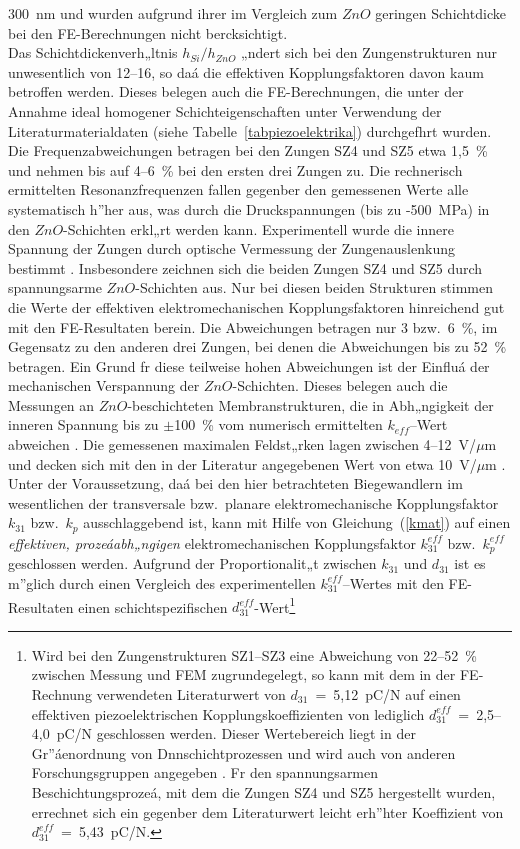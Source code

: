 300~nm und wurden aufgrund ihrer im Vergleich zum $ZnO$ geringen Schichtdicke
bei den FE-Berechnungen nicht bercksichtigt.\\
%
Das Schichtdickenverh„ltnis $h_{Si}/h_{ZnO}$ „ndert sich bei den
Zungenstrukturen nur unwesentlich von  12--16, so daá die effektiven
Kopplungsfaktoren davon kaum betroffen werden. Dieses belegen auch die
FE-Berechnungen, die unter der Annahme ideal homogener Schichteigenschaften
unter Verwendung der Literaturmaterialdaten (siehe
Tabelle~\ref{tabpiezoelektrika}) durchgefhrt wurden.
Die Frequenzabweichungen betragen bei den Zungen SZ4 und SZ5 etwa 1,5~\%
und nehmen bis auf 4--6~\% bei den ersten drei Zungen zu.
Die rechnerisch ermittelten Resonanzfrequenzen fallen gegenber den
gemessenen Werte alle systematisch h”her aus, was durch die Druckspannungen
(bis zu -500~MPa) in den $ZnO$-Schichten erkl„rt werden kann. Experimentell
wurde die innere Spannung der Zungen durch optische Vermessung der
Zungenauslenkung bestimmt \cite{Flik}. Insbesondere zeichnen sich die
beiden Zungen SZ4 und SZ5 durch spannungsarme $ZnO$-Schichten aus.
Nur bei diesen beiden Strukturen stimmen die Werte der effektiven
elektromechanischen Kopplungsfaktoren hinreichend gut mit den FE-Resultaten
berein. Die Abweichungen betragen nur 3 bzw.\ 6~\%, im Gegensatz zu den
anderen drei Zungen, bei denen die Abweichungen bis zu 52~\% betragen.
Ein Grund fr diese teilweise hohen Abweichungen ist der Einfluá der
mechanischen Verspannung der $ZnO$-Schichten.
Dieses belegen auch die Messungen an $ZnO$-beschichteten Membranstrukturen,
die in Abh„ngigkeit der inneren Spannung bis zu $\pm$100~\% vom numerisch
ermittelten $k_{eff}$--Wert abweichen \cite{ABV93}.
Die gemessenen maximalen Feldst„rken lagen zwischen 4--12~V/$\mu$m und
decken sich mit den in der Literatur angegebenen Wert von etwa 10~V/$\mu$m
\cite{Smi92b}.\\
%
Unter der Voraussetzung, daá bei den hier betrachteten Biegewandlern
im wesentlichen der transversale bzw.\ planare elektromechanische
Kopplungsfaktor $k_{31}$ bzw.\ $k_{p}$ ausschlaggebend ist,
kann mit Hilfe von Gleichung~(\ref{kmat}) auf einen {\em effektiven,
prozeáabh„ngigen} elektromechanischen Kopplungsfaktor $k_{31}^{eff}$ bzw.\
$k_{p}^{eff}$ geschlossen werden. Aufgrund der Proportionalit„t zwischen
$k_{31}$ und $d_{31}$ ist es m”glich durch einen Vergleich des
experimentellen $k_{31}^{eff}$--Wertes mit den FE-Resultaten einen
schichtspezifischen
$d^{eff}_{31}$-Wert\footnote{Wird bei den Zungenstrukturen SZ1--SZ3 eine
Abweichung von 22--52~\% zwischen Messung und FEM zugrundegelegt, so kann
mit dem in der FE-Rechnung verwendeten Literaturwert von
$d_{31}$~=~5,12~pC/N auf einen effektiven piezoelektrischen
Kopplungskoeffizienten von lediglich $d^{eff}_{31}$~=~2,5--4,0~pC/N
geschlossen werden. Dieser Wertebereich liegt in der Gr”áenordnung von
Dnnschichtprozessen und wird auch von anderen Forschungsgruppen angegeben
\cite{Pra93}. Fr den spannungsarmen Beschichtungsprozeá, mit dem die
Zungen SZ4 und SZ5 hergestellt wurden, errechnet sich ein gegenber dem
Literaturwert leicht erh”hter Koeffizient von $d^{eff}_{31}$~=~5,43~pC/N.}

